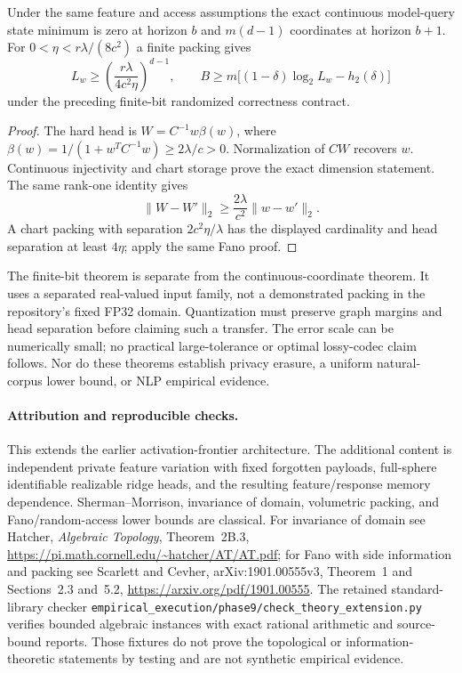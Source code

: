 \begin{corollary}
Under the same feature and access assumptions the exact continuous
model-query state minimum is zero at horizon $b$ and $m(d-1)$ coordinates
at horizon $b+1$.  For $0<\eta<r\lambda/(8c^2)$ a finite packing gives
\[
 L_w\ge\left(\frac{r\lambda}{4c^2\eta}\right)^{d-1},\qquad
 B\ge m\bigl[(1-\delta)\log_2L_w-h_2(\delta)\bigr]
\]
under the preceding finite-bit randomized correctness contract.
\end{corollary}
\begin{proof}
The hard head is $W=C^{-1}w\beta(w)$, where
$\beta(w)=1/(1+w^TC^{-1}w)\ge2\lambda/c>0$.
Normalization of $CW$ recovers $w$.  Continuous injectivity and chart
storage prove the exact dimension statement.  The same rank-one identity
gives
\[
 \|W-W'\|_2\ge\frac{2\lambda}{c^2}\|w-w'\|_2.
\]
A chart packing with separation $2c^2\eta/\lambda$ has the displayed
cardinality and head separation at least $4\eta$; apply the same Fano proof.
\end{proof}

The finite-bit theorem is separate from the continuous-coordinate theorem.
It uses a separated real-valued input family, not a demonstrated packing in
the repository's fixed FP32 domain.  Quantization must preserve graph margins
and head separation before claiming such a transfer.  The error scale can
be numerically small; no practical large-tolerance or optimal lossy-codec
claim follows.  Nor do these theorems establish privacy erasure, a uniform
natural-corpus lower bound, or NLP empirical evidence.

\paragraph{Attribution and reproducible checks.}
This extends the earlier activation-frontier architecture.  The additional
content is independent private feature variation with fixed forgotten
payloads, full-sphere identifiable realizable ridge heads, and the resulting
feature/response memory dependence.  Sherman--Morrison, invariance of domain,
volumetric packing, and Fano/random-access lower bounds are classical.
For invariance of domain see Hatcher, \emph{Algebraic Topology}, Theorem~2B.3,
\url{https://pi.math.cornell.edu/~hatcher/AT/AT.pdf}; for Fano with side
information and packing see Scarlett and Cevher, arXiv:1901.00555v3,
Theorem~1 and Sections~2.3 and~5.2,
\url{https://arxiv.org/pdf/1901.00555}.
The retained standard-library checker
\texttt{empirical\_execution/phase9/check\_theory\_extension.py} verifies
bounded algebraic instances with exact rational arithmetic and source-bound
reports.  Those fixtures do not prove the topological or information-theoretic
statements by testing and are not synthetic empirical evidence.
